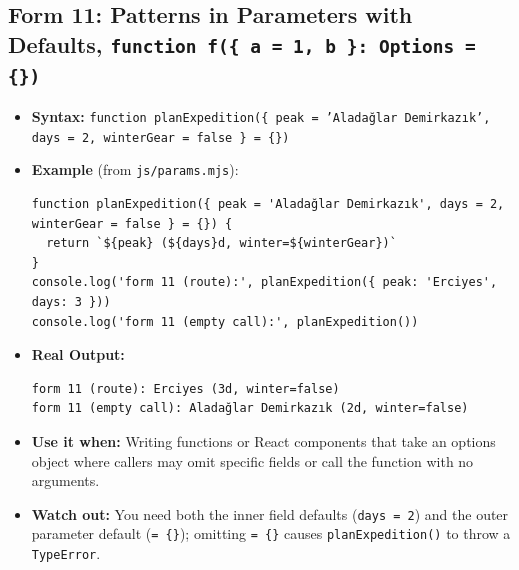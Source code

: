 \documentclass[11pt, a4paper]{article}
\begin{document}
\subsection{Form 11: Patterns in Parameters with Defaults, \texttt{function f(\{ a = 1, b \}: Options = \{\})}}
\begin{itemize}
  \item \textbf{Syntax:} \texttt{function planExpedition(\{ peak = 'Aladağlar Demirkazık', days = 2, winterGear = false \} = \{\})}
  \item \textbf{Example} (from \texttt{js/params.mjs}):
\begin{lstlisting}
function planExpedition({ peak = 'Aladağlar Demirkazık', days = 2, winterGear = false } = {}) {
  return `${peak} (${days}d, winter=${winterGear})`
}
console.log('form 11 (route):', planExpedition({ peak: 'Erciyes', days: 3 }))
console.log('form 11 (empty call):', planExpedition())
\end{lstlisting}
  \item \textbf{Real Output:}
\begin{lstlisting}
form 11 (route): Erciyes (3d, winter=false)
form 11 (empty call): Aladağlar Demirkazık (2d, winter=false)
\end{lstlisting}
  \item \textbf{Use it when:} Writing functions or React components that take an options object where callers may omit specific fields or call the function with no arguments.
  \item \textbf{Watch out:} You need both the inner field defaults (\texttt{days = 2}) and the outer parameter default (\texttt{= \{\}}); omitting \texttt{= \{\}} causes \texttt{planExpedition()} to throw a \texttt{TypeError}.
\end{itemize}
\end{document}
